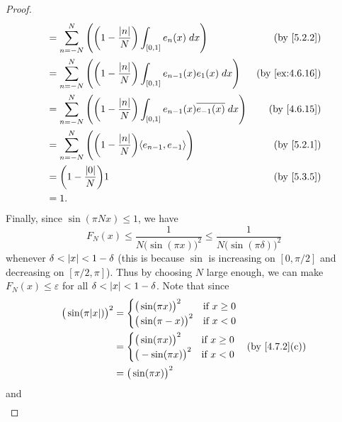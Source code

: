 \begin{proof}
\begin{align*}
     & = \sum_{n = -N}^N \Bigg(\bigg(1 - \frac{\abs{n}}{N}\bigg) \int_{[0, 1]} e_n(x) \; dx\Bigg)                            & \text{(by \cref{5.2.2})}     \\
     & = \sum_{n = -N}^N \Bigg(\bigg(1 - \frac{\abs{n}}{N}\bigg) \int_{[0, 1]} e_{n - 1}(x) e_1(x) \; dx\Bigg)               & \text{(by \cref{ex:4.6.16})} \\
     & = \sum_{n = -N}^N \Bigg(\bigg(1 - \frac{\abs{n}}{N}\bigg) \int_{[0, 1]} e_{n - 1}(x) \overline{e_{-1}(x)} \; dx\Bigg) & \text{(by \cref{4.6.15})}    \\
     & = \sum_{n = -N}^N \Bigg(\bigg(1 - \frac{\abs{n}}{N}\bigg) \inner*{e_{n - 1}, e_{-1}}\Bigg)                            & \text{(by \cref{5.2.1})}     \\
     & = \bigg(1 - \frac{\abs{0}}{N}\bigg) 1                                                                                 & \text{(by \cref{5.3.5})}     \\
     & = 1.
  \end{align*}
  Finally, since \(\sin(\pi N x) \leq 1\), we have
  \[
    F_N(x) \leq \frac{1}{N \big(\sin(\pi x)\big)^2} \leq \frac{1}{N \big(\sin(\pi \delta)\big)^2}
  \]
  whenever \(\delta < \left\lvert x\right\rvert < 1 - \delta\)
  (this is because \(\sin\) is increasing on \([0, \pi / 2]\) and decreasing on \([\pi / 2, \pi]\)).
  Thus by choosing \(N\) large enough, we can make \(F_N (x) \leq \varepsilon\) for all \(\delta < \left\lvert x\right\rvert < 1 - \delta\).
  Note that since
  \begin{align*}
    \big(\sin(\pi \abs{x})\big)^2 & = \begin{cases}
                                        \big(\sin(\pi x)\big)^2  & \text{if } x \geq 0 \\
                                        \big(\sin(\pi -x)\big)^2 & \text{if } x < 0
                                      \end{cases} \\
                                  & = \begin{cases}
                                        \big(\sin(\pi x)\big)^2  & \text{if } x \geq 0 \\
                                        \big(-\sin(\pi x)\big)^2 & \text{if } x < 0
                                      \end{cases} & \text{(by \cref{4.7.2}(c))} \\
                                  & = \big(\sin(\pi x)\big)^2
  \end{align*}
  and
  \begin{align*}

\end{align*}
\end{proof}
